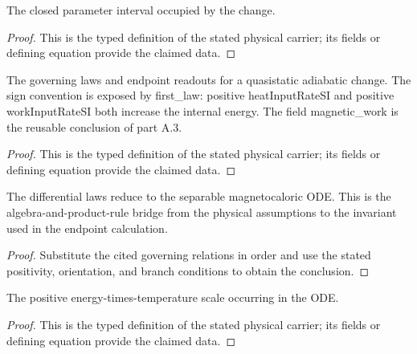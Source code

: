 \begin{definition}
  \label{def:physics:IPhO_2026_3_B_2:aux019}
  The closed parameter interval occupied by the change.
\end{definition}
\begin{proof}
  This is the typed definition of the stated physical carrier; its fields or defining equation provide the claimed data.
\end{proof}

\begin{definition}
  \label{def:physics:IPhO_2026_3_B_2:aux020}
  The governing laws and endpoint readouts for a quasistatic adiabatic change. The sign convention is exposed by first\_law: positive heatInputRateSI and positive workInputRateSI both increase the internal energy. The field magnetic\_work is the reusable conclusion of part A.3.
\end{definition}
\begin{proof}
  This is the typed definition of the stated physical carrier; its fields or defining equation provide the claimed data.
\end{proof}

\begin{lemma}
  \label{lem:physics:IPhO_2026_3_B_2:aux021}
  The differential laws reduce to the separable magnetocaloric ODE. This is the algebra-and-product-rule bridge from the physical assumptions to the invariant used in the endpoint calculation.
\end{lemma}
\begin{proof}
  Substitute the cited governing relations in order and use the stated positivity, orientation, and branch conditions to obtain the conclusion.
\end{proof}

\begin{definition}
  \label{def:physics:IPhO_2026_3_B_2:aux022}
  The positive energy-times-temperature scale occurring in the ODE.
\end{definition}
\begin{proof}
  This is the typed definition of the stated physical carrier; its fields or defining equation provide the claimed data.
\end{proof}

